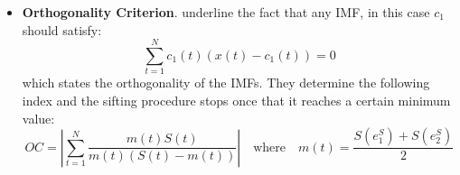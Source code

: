 \documentclass[11pt, a4paper]{article} %
\begin{document}
\begin{itemize}
\item \textbf{Orthogonality Criterion}.
\cite{LinLin} underline the fact that any IMF, in this case $c_1$ should satisfy:
\scriptsize
\begin{equation}
\sum_{t=1}^N c_1\left(t\right)\left(x\left(t\right) - c_1 \left(t\right)\right) = 0
\end{equation}
\small
which states the orthogonality of the IMFs. They determine the following index and the sifting procedure stops once that it reaches a certain minimum value:
\scriptsize
\begin{equation}
OC = \left|\sum_{t=1}^N \frac{m\left(t\right) S(t)}{m\left(t\right)\left(S(t) - m\left(t\right) \right)} \right| \quad \mbox{where} \quad m\left(t\right) = \frac{S(e_1^S)+S(e_2^S)}{2}
\end{equation}
\end{itemize}
\end{document}
